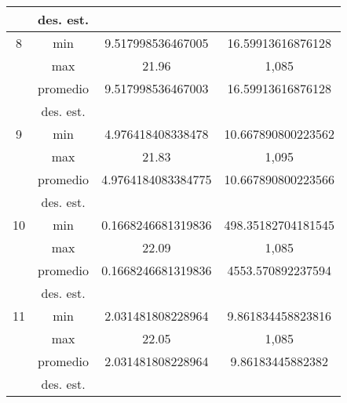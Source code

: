 \documentclass{report}
\begin{document}
\begin{table}[ht]
\begin{tabular}{|c|c|c|c|}
                              & des. est.                   &            &        \\ \hline
        8                     & min                         &      9.517998536467005      &    16.59913616876128    \\ \cline{2-4} 
                              & max                         &     21.96       &    1,085    \\ \cline{2-4} 
                              & promedio                    &     9.517998536467003       &   16.59913616876128     \\ \cline{2-4} 
                              & des. est.                   &            &        \\ \hline
        9                     & min                         &      4.976418408338478      &  10.667890800223562      \\ \cline{2-4} 
                              & max                         &      21.83      &   1,095     \\ \cline{2-4} 
                              & promedio                    &     4.9764184083384775       &    10.667890800223566    \\ \cline{2-4} 
                              & des. est.                   &            &        \\ \hline
        10                    & min                         &      0.1668246681319836      &     498.35182704181545   \\ \cline{2-4} 
                              & max                         &      22.09      &    1,085    \\ \cline{2-4} 
                              & promedio                    &      0.1668246681319836      &    4553.570892237594    \\ \cline{2-4} 
                              & des. est.                   &            &        \\ \hline
        11                    & min                         &      2.031481808228964      &   9.861834458823816     \\ \cline{2-4} 
                              & max                         &     22.05       &   1,085     \\ \cline{2-4} 
                              & promedio                    &       2.031481808228964     &    9.86183445882382    \\ \cline{2-4} 
                              & des. est.                   &            &        \\ \hline

\end{tabular}
\end{table}
\end{document}
